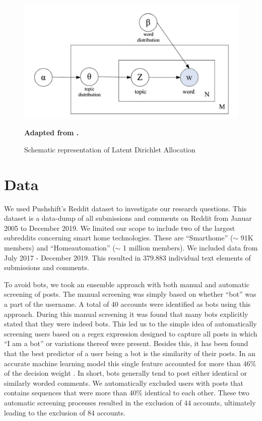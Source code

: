 \documentclass{article}
\begin{document}
\begin{figure}[H]
    \begin{centering}
    \includegraphics[scale=0.4]{../Figure/cao_juan.PNG}
    \caption{Schematic representation of Latent Dirichlet Allocation}
    \end{centering}
    \begin{footnotesize} 
        \begin{center}
            \textbf{Adapted from .}
        \end{center}
    \end{footnotesize}
\end{figure}

    \section{Data}
    We used Pushshift’s Reddit dataset \cite{baumgartner2020pushshift} to investigate our research questions. This dataset is a data-dump of all submissions and comments on Reddit from Januar 2005 to December 2019. We limited our scope to include two of the largest subreddits concerning smart home technologies. These are “Smarthome” ($\sim$ 91K members) and “Homeautomation” ($\sim$ 1 million members). We included data from July 2017 - December 2019. This resulted in 379.883 individual text elements of submissions and comments. 

To avoid bots, we took an ensemble approach with both manual and automatic screening of posts. The manual screening was simply based on whether “bot” was a part of the username. A total of 40 accounts were identified as bots using this approach. During this manual screening it was found that many bots explicitly stated that they were indeed bots. This led us to the simple idea of automatically screening users based on a regex expression designed to capture all posts in which “I am a bot” or variations thereof were present. Besides this, it has been found \cite{skowronski_identifying_2019} that the best predictor of a user being a bot is the similarity of their posts. In an accurate machine learning model this single feature accounted for more than 46\% of the decision weight \cite{skowronski_identifying_2019}. In short, bots generally tend to post either identical or similarly worded comments. We automatically excluded users with posts that contains sequences that were more than 40\% identical to each other. These two automatic screening processes resulted in the exclusion of 44 accounts, ultimately leading to the exclusion of 84 accounts. 
\end{document}
